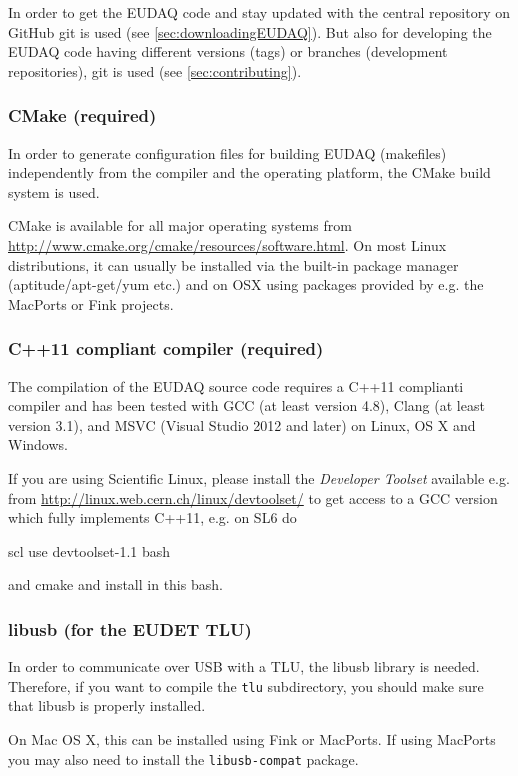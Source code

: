 In order to get the EUDAQ code and stay updated with the central repository on GitHub git is used (see \autoref{sec:downloadingEUDAQ}).
But also for developing the EUDAQ code having different versions (tags) or branches (development repositories), git is used (see \autoref{sec:contributing}).


\subsubsection{CMake (required)}
In order to generate configuration files for building EUDAQ (makefiles) independently from the compiler and the operating platform, the CMake build system is used.

CMake is available for all major operating systems from \url{http://www.cmake.org/cmake/resources/software.html}. 
On most Linux distributions, it can usually be installed via the built-in package manager (aptitude/apt-get/yum etc.) and on OSX using packages provided by e.g. the MacPorts or Fink projects.

\subsubsection{C++11 compliant compiler (required)}
The compilation of the EUDAQ source code requires a C++11 complianti compiler and has been tested with GCC (at least version 4.8), Clang (at least version 3.1), and MSVC (Visual Studio 2012 and later) on Linux, OS X and Windows.

If you are using Scientific Linux, please install the \emph{Developer Toolset} available e.g. from \url{http://linux.web.cern.ch/linux/devtoolset/} to get access to a GCC version which fully implements C++11, e.g. on SL6 do
\begin{listing}[mybash]
scl use devtoolset-1.1 bash
\end{listing}
and cmake and install in this bash.

\subsubsection{libusb (for the EUDET TLU)}
In order to communicate over USB with a \gls{TLU}, the libusb library is needed.
Therefore, if you want to compile the \texttt{tlu} subdirectory, you should make sure that libusb is properly installed.

On Mac OS X, this can be installed using Fink or MacPorts.
If using MacPorts you may also need to install the \texttt{libusb-compat} package.

